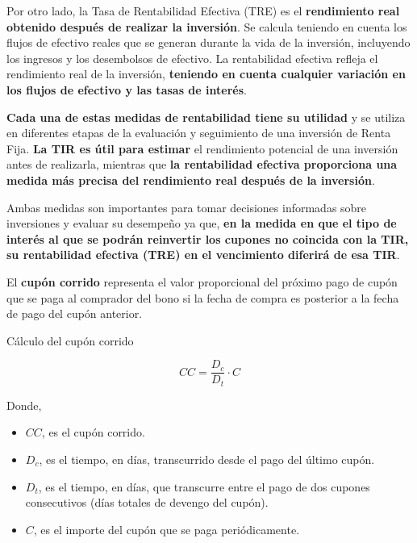 \documentclass[
  letterpaper,
  DIV=11,
  numbers=noendperiod]{scrartcl}
\begin{document}
Por otro lado, la Tasa de Rentabilidad Efectiva (TRE) es el
\textbf{rendimiento real obtenido después de realizar la inversión}. Se
calcula teniendo en cuenta los flujos de efectivo reales que se generan
durante la vida de la inversión, incluyendo los ingresos y los
desembolsos de efectivo. La rentabilidad efectiva refleja el rendimiento
real de la inversión, \textbf{teniendo en cuenta cualquier variación en
los flujos de efectivo y las tasas de interés}.

\textbf{Cada una de estas medidas de rentabilidad tiene su utilidad} y
se utiliza en diferentes etapas de la evaluación y seguimiento de una
inversión de Renta Fija. \textbf{La TIR es útil para estimar} el
rendimiento potencial de una inversión antes de realizarla, mientras que
\textbf{la rentabilidad efectiva proporciona una medida más precisa del
rendimiento real después de la inversión}.

Ambas medidas son importantes para tomar decisiones informadas sobre
inversiones y evaluar su desempeño ya que, \textbf{en la medida en que
el tipo de interés al que se podrán reinvertir los cupones no coincida
con la TIR, su rentabilidad efectiva (TRE) en el vencimiento diferirá de
esa TIR}.

El \textbf{cupón corrido} representa el valor proporcional del próximo
pago de cupón que se paga al comprador del bono si la fecha de compra es
posterior a la fecha de pago del cupón anterior.

\begin{tcolorbox}[enhanced jigsaw, colframe=quarto-callout-note-color-frame, opacityback=0, colback=white, leftrule=.75mm, left=2mm, breakable, arc=.35mm, rightrule=.15mm, toprule=.15mm, bottomrule=.15mm]
\begin{minipage}[t]{5.5mm}
\textcolor{quarto-callout-note-color}{\faInfo}
\end{minipage}%
\begin{minipage}[t]{\textwidth - 5.5mm}

Cálculo del cupón corrido

\[CC=\frac{D_c}{D_t}\cdot C\]

Donde,

\begin{itemize}
\item
  \(CC\), es el cupón corrido.
\item
  \(D_{c}\), es el tiempo, en días, transcurrido desde el pago del
  último cupón.
\item
  \(D_{t}\), es el tiempo, en días, que transcurre entre el pago de dos
  cupones consecutivos (días totales de devengo del cupón).
\item
  \(C\), es el importe del cupón que se paga periódicamente.
\end{itemize}

\end{minipage}%
\end{tcolorbox}
\end{document}
